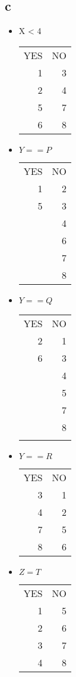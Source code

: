 \documentclass[11pt]{article}
\begin{document}
\subsection*{c}
\label{sec:org8bcd0e4}
\begin{itemize}
\item X < 4
\begin{center}
\begin{tabular}{rr}
YES & NO\\
1 & 3\\
2 & 4\\
5 & 7\\
6 & 8\\
\end{tabular}
\end{center}
\item \(Y == P\)
\begin{center}
\begin{tabular}{rr}
YES & NO\\
1 & 2\\
5 & 3\\
 & 4\\
 & 6\\
 & 7\\
 & 8\\
\end{tabular}
\end{center}

\item \(Y == Q\)
\begin{center}
\begin{tabular}{rr}
YES & NO\\
2 & 1\\
6 & 3\\
 & 4\\
 & 5\\
 & 7\\
 & 8\\
 & \\
\end{tabular}
\end{center}

\item \(Y == R\)
\begin{center}
\begin{tabular}{rr}
YES & NO\\
3 & 1\\
4 & 2\\
7 & 5\\
8 & 6\\
\end{tabular}
\end{center}

\item \(Z = T\)
\begin{center}
\begin{tabular}{rr}
YES & NO\\
1 & 5\\
2 & 6\\
3 & 7\\
4 & 8\\
\end{tabular}
\end{center}
\end{itemize}
\end{document}
